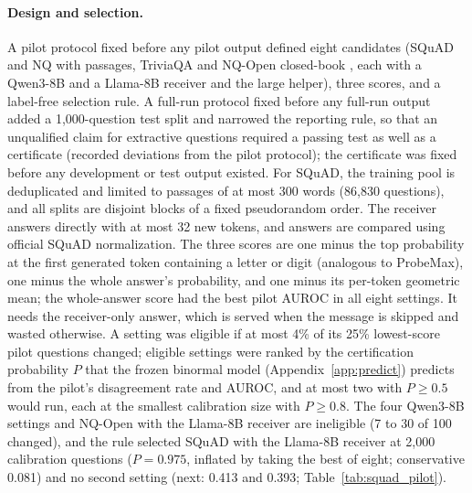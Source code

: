 \paragraph{Design and selection.} A pilot protocol fixed before any pilot output defined eight candidates (SQuAD and NQ with passages, TriviaQA and NQ-Open closed-book \citep{rajpurkar2016squad,kwiatkowski2019nq,fisch2019mrqa,joshi2017triviaqa,lee2019latent}, each with a Qwen3-8B and a Llama-8B receiver and the large helper), three scores, and a label-free selection rule. A full-run protocol fixed before any full-run output added a 1,000-question test split and narrowed the reporting rule, so that an unqualified claim for extractive questions required a passing test as well as a certificate (recorded deviations from the pilot protocol); the certificate was fixed before any development or test output existed. For SQuAD, the training pool is deduplicated and limited to passages of at most 300 words (86,830 questions), and all splits are disjoint blocks of a fixed pseudorandom order. The receiver answers directly with at most 32 new tokens, and answers are compared using official SQuAD normalization. The three scores are one minus the top probability at the first generated token containing a letter or digit (analogous to ProbeMax), one minus the whole answer's probability, and one minus its per-token geometric mean; the whole-answer score had the best pilot AUROC in all eight settings. It needs the receiver-only answer, which is served when the message is skipped and wasted otherwise. A setting was eligible if at most 4\% of its 25\% lowest-score pilot questions changed; eligible settings were ranked by the certification probability $P$ that the frozen binormal model (Appendix~\ref{app:predict}) predicts from the pilot's disagreement rate and AUROC, and at most two with $P\ge0.5$ would run, each at the smallest calibration size with $P\ge0.8$. The four Qwen3-8B settings and NQ-Open with the Llama-8B receiver are ineligible (7 to 30 of 100 changed), and the rule selected SQuAD with the Llama-8B receiver at 2,000 calibration questions ($P=0.975$, inflated by taking the best of eight; conservative 0.081) and no second setting (next: 0.413 and 0.393; Table~\ref{tab:squad_pilot}).

